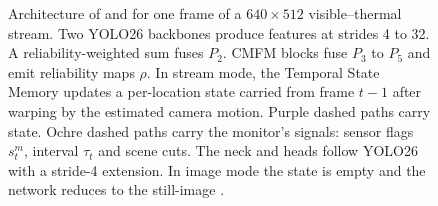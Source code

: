 \begin{figure}[p]

\vspace{4mm}
\caption[Architecture of \method{} and \methodS{}]{Architecture of
\method{} and \methodS{} for one frame of a $640\times512$ visible--thermal
stream. Two YOLO26 backbones produce features at strides 4 to 32. A
reliability-weighted sum fuses $P_2$. CMFM blocks fuse $P_3$ to $P_5$ and
emit reliability maps $\rho$. In stream mode, the Temporal State Memory
updates a per-location state carried from frame $t-1$ after warping by the
estimated camera motion. Purple dashed paths carry state. Ochre dashed
paths carry the monitor's signals: sensor flags $s^m_t$, interval $\tau_t$
and scene cuts. The neck and heads follow YOLO26 with a stride-4 extension.
In image mode the state is empty and the network reduces to the still-image
\method{}.}
\label{fig:arch}
\end{figure}
